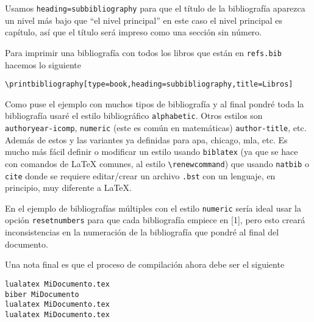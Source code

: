 Usamos \texttt{heading=subbibliography} para que el título de la bibliografía
aparezca un nivel más bajo que \enquote{el nivel principal} en este caso el nivel
principal es capítulo, así que el título será impreso como una sección sin
número.

Para imprimir una bibliografía con todos los libros que están en
\texttt{refs.bib} hacemos lo siguiente
\begin{flushleft}
  \verb|\printbibliography[type=book,heading=subbibliography,title=Libros]|
\end{flushleft}
\printbibliography[type=book,heading=subbibliography,title=Libros]

Como puse el ejemplo con muchos tipos de bibliografía y al final pondré toda
la bibliografía usaré el estilo bibliográfico \texttt{alphabetic}.
Otros estilos son \texttt{authoryear-icomp}, \texttt{numeric} (este es común
en matemáticas) \texttt{author-title}, etc. Además de estos y las variantes
ya definidas para apa, chicago, mla, etc. Es mucho más fácil definir o
modificar un estilo usando \texttt{biblatex} (ya que se hace con comandos de
\LaTeX{} comunes, al estilo \verb|\renewcommand|) que usando \texttt{natbib}
o \texttt{cite} donde se requiere editar/crear un archivo \texttt{.bst} con
un lenguaje, en principio, muy diferente a \LaTeX.

En el ejemplo de bibliografías múltiples con el estilo \texttt{numeric}
sería ideal usar la opción \texttt{resetnumbers} para que cada bibliografía
empiece en [1], pero esto creará inconsistencias en la numeración de la
bibliografía que pondré al final del documento.

Una nota final es que el proceso de compilación ahora debe ser el siguiente
\begin{flushleft}
\verb|lualatex MiDocumento.tex|\\
\verb|biber MiDocumento|\\
\verb|lualatex MiDocumento.tex|\\
\verb|lualatex MiDocumento.tex|
\end{flushleft}
